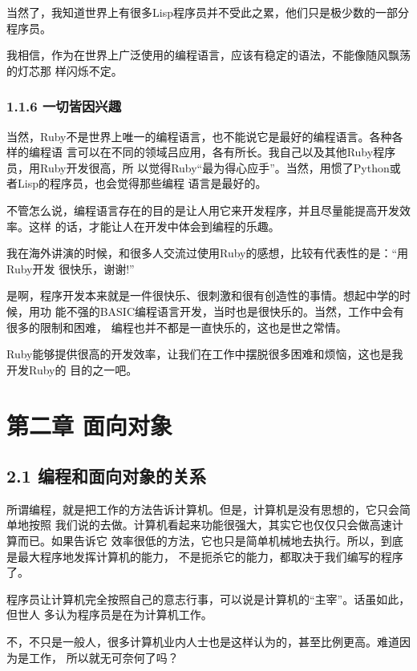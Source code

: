 \documentclass[11pt]{ctexart}
\begin{document}
当然了，我知道世界上有很多Lisp程序员并不受此之累，他们只是极少数的一部分程序员。

我相信，作为在世界上广泛使用的编程语言，应该有稳定的语法，不能像随风飘荡的灯芯那
样闪烁不定。

\subsubsection{1.1.6 一切皆因兴趣}
\label{sec:orgheadline6}

当然，Ruby不是世界上唯一的编程语言，也不能说它是最好的编程语言。各种各样的编程语
言可以在不同的领域吕应用，各有所长。我自己以及其他Ruby程序员，用Ruby开发很高，所
以觉得Ruby“最为得心应手”。当然，用惯了Python或者Lisp的程序员，也会觉得那些编程
语言是最好的。

不管怎么说，编程语言存在的目的是让人用它来开发程序，并且尽量能提高开发效率。这样
的话，才能让人在开发中体会到编程的乐趣。

我在海外讲演的时候，和很多人交流过使用Ruby的感想，比较有代表性的是：“用Ruby开发
很快乐，谢谢!”

是啊，程序开发本来就是一件很快乐、很刺激和很有创造性的事情。想起中学的时候，用功
能不强的BASIC编程语言开发，当时也是很快乐的。当然，工作中会有很多的限制和困难，
编程也并不都是一直快乐的，这也是世之常情。

Ruby能够提供很高的开发效率，让我们在工作中摆脱很多困难和烦恼，这也是我开发Ruby的
目的之一吧。

\section{第二章 面向对象}
\label{sec:orgheadline16}

\subsection{2.1 编程和面向对象的关系}
\label{sec:orgheadline15}

所谓编程，就是把工作的方法告诉计算机。但是，计算机是没有思想的，它只会简单地按照
我们说的去做。计算机看起来功能很强大，其实它也仅仅只会做高速计算而已。如果告诉它
效率很低的方法，它也只是简单机械地去执行。所以，到底是最大程序地发挥计算机的能力，
不是扼杀它的能力，都取决于我们编写的程序了。

程序员让计算机完全按照自己的意志行事，可以说是计算机的“主宰”。话虽如此，但世人
多认为程序员是在为计算机工作。

不，不只是一般人，很多计算机业内人士也是这样认为的，甚至比例更高。难道因为是工作，
所以就无可奈何了吗？
\end{document}
